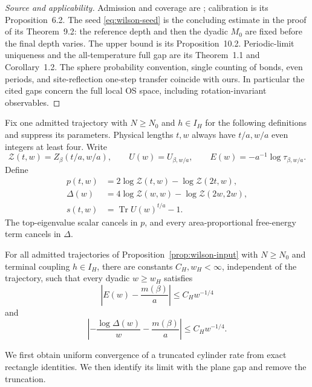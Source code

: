 \begin{proof}[Source and applicability]
Admission and coverage are \cite[Proposition~7.1]{SharpO4};
calibration is its Proposition~6.2. The seed
\eqref{eq:wilson-seed} is the concluding estimate in the proof
of its Theorem~9.2: the reference depth and then the dyadic
$M_0$ are fixed before the final depth varies. The upper bound
is its Proposition~10.2. Periodic-limit uniqueness and the
all-temperature full gap are its Theorem~1.1 and Corollary~1.2.
The sphere probability convention, single counting of bonds,
even periods, and site-reflection one-step transfer coincide
with ours. In particular the cited gaps concern the full local
OS space, including rotation-invariant observables.
\end{proof}

Fix one admitted trajectory with $N\ge N_0$ and $h\in I_H$
for the following definitions and suppress its parameters.
Physical lengths $t,w$ always have $t/a,w/a$
even integers at least four. Write
\[
 \mathcal Z(t,w)=Z_\beta(t/a,w/a),\qquad
 U(w)=U_{\beta,w/a},\qquad E(w)=-a^{-1}\log\tau_{\beta,w/a}.
\]
Define
\begin{align*}
 p(t,w)&=2\log\mathcal Z(t,w)-\log\mathcal Z(2t,w),\\
 \Delta(w)&=4\log\mathcal Z(w,w)-\log\mathcal Z(2w,2w),\\
 s(t,w)&=\operatorname{Tr}U(w)^{t/a}-1.
\end{align*}
The top-eigenvalue scalar cancels in $p$, and every
area-proportional free-energy term cancels in $\Delta$.

\begin{proposition}
\label{prop:cylinder-rate}
\label{prop:wilson-partition-rate}
For all admitted trajectories of Proposition~\ref{prop:wilson-input}
with $N\ge N_0$ and terminal coupling $h\in I_H$, there are
constants $C_H,w_H<\infty$, independent of the trajectory,
such that every dyadic $w\ge w_H$ satisfies
\begin{equation}
 \left|E(w)-\frac{m(\beta)}a\right|\le C_Hw^{-1/4}
 \label{eq:wilson-cylinder-rate}
\end{equation}
and
\begin{equation}
 \left|-\frac{\log\Delta(w)}w-\frac{m(\beta)}a\right|
       \le C_Hw^{-1/4}.
 \label{eq:partition-rate}
\end{equation}
\end{proposition}

We first obtain uniform convergence of a truncated cylinder
rate from exact rectangle identities. We then identify its
limit with the plane gap and remove the truncation.

